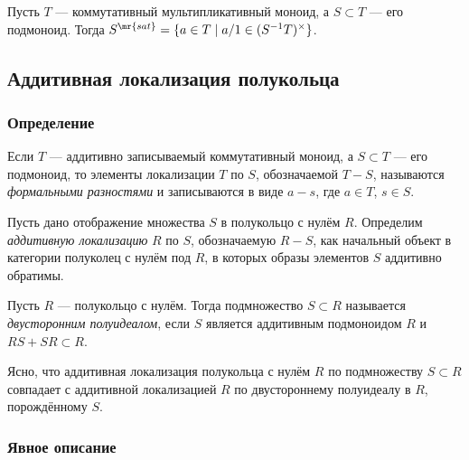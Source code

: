 \documentclass[
	extrafontsizes,
	11pt,
	hyphens,
]{memoir}
\begin{document}
\begin{observation}
Пусть \(T\) --- коммутативный мультипликативный моноид, а \(S \subset T\) --- его подмоноид.
Тогда \(S^\mr{sat} = \{a \in T \mid a/1 \in (S^{-1}T)^\times\}\).
\end{observation}

\subsection{Аддитивная локализация полукольца}

\subsubsection{Определение}

\begin{notation}
Если \(T\) --- аддитивно записываемый коммутативный моноид, а \(S \subset T\) --- его подмоноид, то элементы локализации \(T\) по \(S\), обозначаемой \(T - S\), называются \emph{формальными разностями} и записываются в виде \(a - s\), где \(a \in T\), \(s \in S\).
\end{notation}

\begin{definition}
Пусть дано отображение множества \(S\) в полукольцо с нулём \(R\). Определим \emph{аддитивную локализацию} \(R\) по \(S\), обозначаемую \(R - S\), как начальный объект в категории полуколец с нулём под \(R\), в которых образы элементов \(S\) аддитивно обратимы.
\end{definition}

\begin{definition}
Пусть \(R\) --- полукольцо с нулём.
Тогда подмножество \(S \subset R\) называется \emph{двусторонним полуидеалом}, если \(S\) является аддитивным подмоноидом \(R\) и \(RS + SR \subset R\).
\end{definition}

\begin{observation}
Ясно, что аддитивная локализация полукольца с нулём \(R\) по подмножеству \(S \subset R\) совпадает с аддитивной локализацией \(R\) по двустороннему полуидеалу в \(R\), порождённому \(S\).
\end{observation}

\subsubsection{Явное описание}
\end{document}
